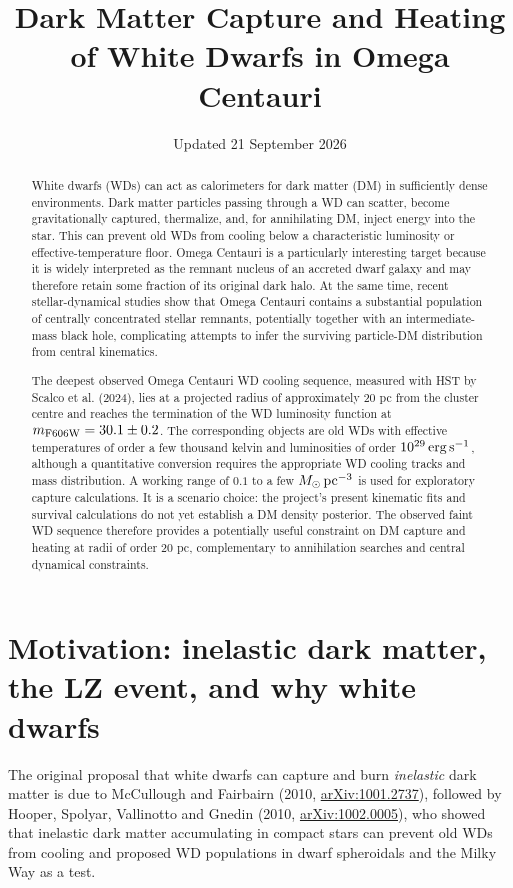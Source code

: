 \documentclass[11pt,a4paper]{article}
\title{Dark Matter Capture and Heating of White Dwarfs in Omega Centauri}
\author{}
\date{Updated 21 September 2026}
\begin{document}
\maketitle

\begin{abstract}
White dwarfs (WDs) can act as calorimeters for dark matter (DM) in sufficiently dense environments. Dark matter particles passing through a WD can scatter, become gravitationally captured, thermalize, and, for annihilating DM, inject energy into the star. This can prevent old WDs from cooling below a characteristic luminosity or effective-temperature floor. Omega Centauri is a particularly interesting target because it is widely interpreted as the remnant nucleus of an accreted dwarf galaxy and may therefore retain some fraction of its original dark halo. At the same time, recent stellar-dynamical studies show that Omega Centauri contains a substantial population of centrally concentrated stellar remnants, potentially together with an intermediate-mass black hole, complicating attempts to infer the surviving particle-DM distribution from central kinematics.

The deepest observed Omega Centauri WD cooling sequence, measured with HST by Scalco et al. (2024), lies at a projected radius of approximately 20 pc from the cluster centre and reaches the termination of the WD luminosity function at $m_{\rm F606W}=30.1\pm0.2$. The corresponding objects are old WDs with effective temperatures of order a few thousand kelvin and luminosities of order $10^{29}\,{\rm erg\,s^{-1}}$, although a quantitative conversion requires the appropriate WD cooling tracks and mass distribution. A working range of $0.1$ to a few $M_\odot\,{\rm pc}^{-3}$ is used for exploratory
capture calculations. It is a scenario choice: the project's present kinematic fits and
survival calculations do not yet establish a DM density posterior. The observed faint WD sequence therefore provides a potentially useful constraint on DM capture and heating at radii of order 20 pc, complementary to annihilation searches and central dynamical constraints.
\end{abstract}



\section{Motivation: inelastic dark matter, the LZ event, and why white dwarfs}

The original proposal that white dwarfs can capture and burn \emph{inelastic} dark matter is due to McCullough and Fairbairn (2010, \href{https://arxiv.org/abs/1001.2737}{arXiv:1001.2737}), followed by Hooper, Spolyar, Vallinotto and Gnedin (2010, \href{https://arxiv.org/abs/1002.0005}{arXiv:1002.0005}), who showed that inelastic dark matter accumulating in compact stars can prevent old WDs from cooling and proposed WD populations in dwarf spheroidals and the Milky Way as a test.
\end{document}
